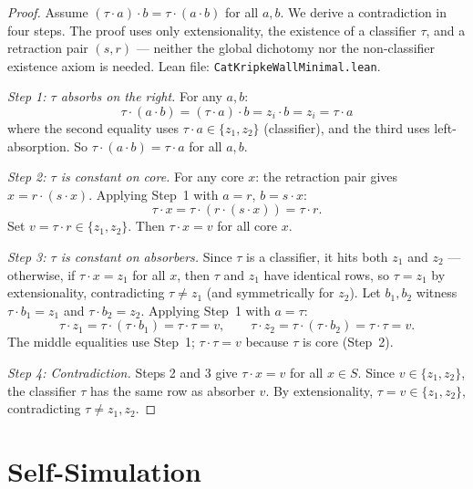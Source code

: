 \documentclass[a4paper,UKenglish,cleveref,autoref,thm-restate]{lipics-v2021}
\newcommand{\dotop}{\cdot}
\begin{document}
\begin{proof}
Assume $(\tau \dotop a) \dotop b = \tau \dotop (a \dotop b)$ for all $a, b$. We derive a contradiction in four steps. The proof uses only extensionality, the existence of a classifier $\tau$, and a retraction pair $(s, r)$ --- neither the global dichotomy nor the non-classifier existence axiom is needed. Lean file: \texttt{CatKripkeWallMinimal.lean}.

\emph{Step 1: $\tau$ absorbs on the right.} For any $a, b$:
\[
\tau \dotop (a \dotop b)
= (\tau \dotop a) \dotop b
= z_i \dotop b
= z_i
= \tau \dotop a
\]
where the second equality uses $\tau \dotop a \in \{z_1, z_2\}$ (classifier), and the third uses left-absorption. So $\tau \dotop (a \dotop b) = \tau \dotop a$ for all $a, b$.

\emph{Step 2: $\tau$ is constant on core.} For any core $x$: the retraction pair gives $x = r \dotop (s \dotop x)$. Applying Step~1 with $a = r$, $b = s \dotop x$:
\[
\tau \dotop x = \tau \dotop (r \dotop (s \dotop x)) = \tau \dotop r.
\]
Set $v = \tau \dotop r \in \{z_1, z_2\}$. Then $\tau \dotop x = v$ for all core $x$.

\emph{Step 3: $\tau$ is constant on absorbers.} Since $\tau$ is a classifier, it hits both $z_1$ and $z_2$ --- otherwise, if $\tau \dotop x = z_1$ for all $x$, then $\tau$ and $z_1$ have identical rows, so $\tau = z_1$ by extensionality, contradicting $\tau \neq z_1$ (and symmetrically for $z_2$). Let $b_1, b_2$ witness $\tau \dotop b_1 = z_1$ and $\tau \dotop b_2 = z_2$. Applying Step~1 with $a = \tau$:
\[
\tau \dotop z_1 = \tau \dotop (\tau \dotop b_1) = \tau \dotop \tau = v,
\qquad
\tau \dotop z_2 = \tau \dotop (\tau \dotop b_2) = \tau \dotop \tau = v.
\]
The middle equalities use Step~1; $\tau \dotop \tau = v$ because $\tau$ is core (Step~2).

\emph{Step 4: Contradiction.} Steps 2 and 3 give $\tau \dotop x = v$ for all $x \in S$. Since $v \in \{z_1, z_2\}$, the classifier $\tau$ has the same row as absorber $v$. By extensionality, $\tau = v \in \{z_1, z_2\}$, contradicting $\tau \neq z_1, z_2$.
\end{proof}

\section{Self-Simulation}
\label{sec:selfsim}
\end{document}
